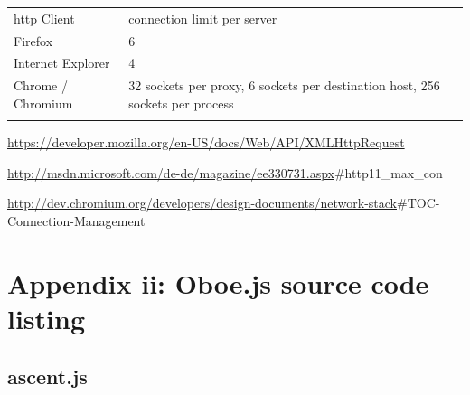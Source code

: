 \documentclass[12pt, ]{article}
\let\stdsection\section
\renewcommand\section{\newpage\stdsection}
\begin{document}
\begin{longtable}[c]{@{}ll@{}}
\hline\noalign{\medskip}
\begin{minipage}[b]{0.21\columnwidth}\raggedright
http Client
\end{minipage} & \begin{minipage}[b]{0.27\columnwidth}\raggedright
connection limit per server
\end{minipage}
\\\noalign{\medskip}
\hline\noalign{\medskip}
\begin{minipage}[t]{0.21\columnwidth}\raggedright
Firefox
\end{minipage} & \begin{minipage}[t]{0.27\columnwidth}\raggedright
6
\end{minipage}
\\\noalign{\medskip}
\begin{minipage}[t]{0.21\columnwidth}\raggedright
Internet Explorer
\end{minipage} & \begin{minipage}[t]{0.27\columnwidth}\raggedright
4
\end{minipage}
\\\noalign{\medskip}
\begin{minipage}[t]{0.21\columnwidth}\raggedright
Chrome / Chromium
\end{minipage} & \begin{minipage}[t]{0.27\columnwidth}\raggedright
32 sockets per proxy, 6 sockets per destination host, 256 sockets per
process
\end{minipage}
\\\noalign{\medskip}
\hline
\end{longtable}

\url{https://developer.mozilla.org/en-US/docs/Web/API/XMLHttpRequest}

\url{http://msdn.microsoft.com/de-de/magazine/ee330731.aspx}\#http11\_max\_con

\url{http://dev.chromium.org/developers/design-documents/network-stack}\#TOC-Connection-Management

\section{Appendix ii: Oboe.js source code
listing}\label{appendix-ii-oboe.js-source-code-listing}

\subsection{ascent.js}\label{headerux5fascent}
\end{document}
